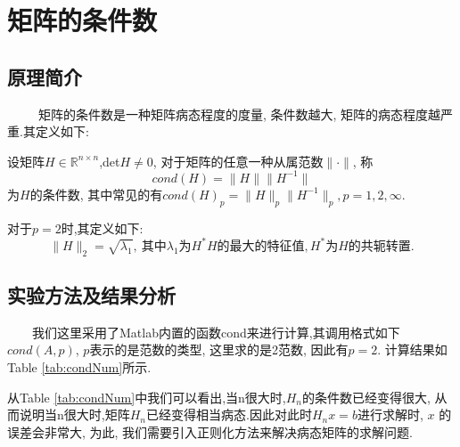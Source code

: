 \documentclass[a4paper]{article}
\begin{document}
\begin{CJK*}{GBK}{song}
\begin{center}
\begin{table*}[!htpb]
{\begin{threeparttable}[!htpb]
\begin{tabular}{ccccc ccccc ccccc}
 \bottomrule
\end{tabular}
\end{threeparttable}}%
\end{table*}
\end{center}



\section{矩阵的条件数}
\subsection{原理简介}

~~~~~矩阵的条件数是一种矩阵病态程度的度量, 条件数越大, 矩阵的病态程度越严重.其定义如下:\par
设矩阵$H \in \mathbb{R}^{n \times n}$,det$H\neq 0$, 对于矩阵的任意一种从属范数$\|\cdot\|$, 称$$cond(H)=\|H\| \|H^{-1}\| $$为$H$的条件数, 其中常见的有$cond(H)_p=\|H\|_p \|H^{-1}\|_p,p=1,2,\infty.$

对于$p=2$时,其定义如下:
$$\|H\|_2=\sqrt{\lambda_1}, \ \text{其中}\lambda_1\text{为}H^*H\text{的最大的特征值}, H^*\text{为}H\text{的共轭转置}.$$
\subsection{实验方法及结果分析}
~~~~我们这里采用了Matlab内置的函数cond来进行计算,其调用格式如下$cond(A,p)$, $p$表示的是范数的类型, 这里求的是2范数, 因此有$p=2$. 计算结果如Table \ref{tab:condNum}所示.
\par
从Table \ref{tab:condNum}中我们可以看出,当n很大时,$H_n$的条件数已经变得很大, 从而说明当n很大时,矩阵$H_n$已经变得相当病态.因此对此时$H_nx=b$进行求解时, $x$ 的误差会非常大, 为此, 我们需要引入正则化方法来解决病态矩阵的求解问题.
\begin{center}
\begin{table*}[!htpb]
\end{table*}
\end{center}
\end{CJK*}
\end{document}
